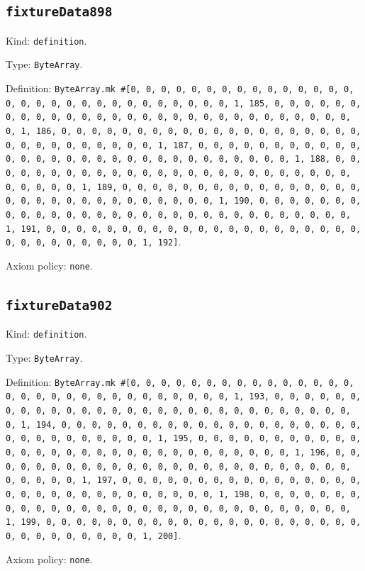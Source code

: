 \documentclass[11pt]{article}
\begin{document}
\subsection*{\texttt{fixtureData898}}
\noindent Kind: \texttt{definition}.\par
\noindent Type: \texttt{ByteArray}.\par
\noindent Definition: \texttt{ByteArray.mk \#[0, 0, 0, 0, 0, 0, 0, 0, 0, 0, 0, 0, 0, 0, 0, 0, 0, 0, 0, 0, 0, 0, 0, 0, 0, 0, 0, 0, 0, 0, 1, 185, 0, 0, 0, 0, 0, 0, 0, 0, 0, 0, 0, 0, 0, 0, 0, 0, 0, 0, 0, 0, 0, 0, 0, 0, 0, 0, 0, 0, 0, 0, 1, 186, 0, 0, 0, 0, 0, 0, 0, 0, 0, 0, 0, 0, 0, 0, 0, 0, 0, 0, 0, 0, 0, 0, 0, 0, 0, 0, 0, 0, 0, 0, 1, 187, 0, 0, 0, 0, 0, 0, 0, 0, 0, 0, 0, 0, 0, 0, 0, 0, 0, 0, 0, 0, 0, 0, 0, 0, 0, 0, 0, 0, 0, 0, 1, 188, 0, 0, 0, 0, 0, 0, 0, 0, 0, 0, 0, 0, 0, 0, 0, 0, 0, 0, 0, 0, 0, 0, 0, 0, 0, 0, 0, 0, 0, 0, 1, 189, 0, 0, 0, 0, 0, 0, 0, 0, 0, 0, 0, 0, 0, 0, 0, 0, 0, 0, 0, 0, 0, 0, 0, 0, 0, 0, 0, 0, 0, 0, 1, 190, 0, 0, 0, 0, 0, 0, 0, 0, 0, 0, 0, 0, 0, 0, 0, 0, 0, 0, 0, 0, 0, 0, 0, 0, 0, 0, 0, 0, 0, 0, 1, 191, 0, 0, 0, 0, 0, 0, 0, 0, 0, 0, 0, 0, 0, 0, 0, 0, 0, 0, 0, 0, 0, 0, 0, 0, 0, 0, 0, 0, 0, 0, 1, 192]}.\par
\noindent Axiom policy: \texttt{none}.\par
\subsection*{\texttt{fixtureData902}}
\noindent Kind: \texttt{definition}.\par
\noindent Type: \texttt{ByteArray}.\par
\noindent Definition: \texttt{ByteArray.mk \#[0, 0, 0, 0, 0, 0, 0, 0, 0, 0, 0, 0, 0, 0, 0, 0, 0, 0, 0, 0, 0, 0, 0, 0, 0, 0, 0, 0, 0, 0, 1, 193, 0, 0, 0, 0, 0, 0, 0, 0, 0, 0, 0, 0, 0, 0, 0, 0, 0, 0, 0, 0, 0, 0, 0, 0, 0, 0, 0, 0, 0, 0, 1, 194, 0, 0, 0, 0, 0, 0, 0, 0, 0, 0, 0, 0, 0, 0, 0, 0, 0, 0, 0, 0, 0, 0, 0, 0, 0, 0, 0, 0, 0, 0, 1, 195, 0, 0, 0, 0, 0, 0, 0, 0, 0, 0, 0, 0, 0, 0, 0, 0, 0, 0, 0, 0, 0, 0, 0, 0, 0, 0, 0, 0, 0, 0, 1, 196, 0, 0, 0, 0, 0, 0, 0, 0, 0, 0, 0, 0, 0, 0, 0, 0, 0, 0, 0, 0, 0, 0, 0, 0, 0, 0, 0, 0, 0, 0, 1, 197, 0, 0, 0, 0, 0, 0, 0, 0, 0, 0, 0, 0, 0, 0, 0, 0, 0, 0, 0, 0, 0, 0, 0, 0, 0, 0, 0, 0, 0, 0, 1, 198, 0, 0, 0, 0, 0, 0, 0, 0, 0, 0, 0, 0, 0, 0, 0, 0, 0, 0, 0, 0, 0, 0, 0, 0, 0, 0, 0, 0, 0, 0, 1, 199, 0, 0, 0, 0, 0, 0, 0, 0, 0, 0, 0, 0, 0, 0, 0, 0, 0, 0, 0, 0, 0, 0, 0, 0, 0, 0, 0, 0, 0, 0, 1, 200]}.\par
\noindent Axiom policy: \texttt{none}.\par
\end{document}
